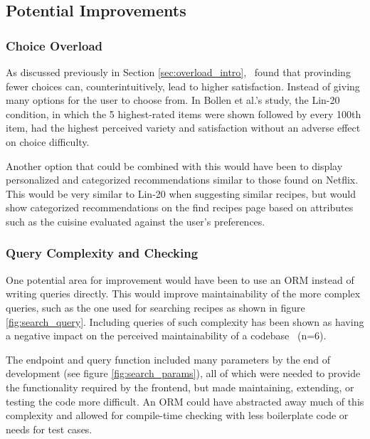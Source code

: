 \subsection{Potential Improvements}

\subsubsection{Choice Overload}\label{sec:choice_overload}
As discussed previously in Section \ref{sec:overload_intro},~\cite{bollen_understanding_2010} found that
provinding fewer choices can, counterintuitively, lead to higher satisfaction. Instead of giving
many options for the user to choose from. In Bollen et al.'s study, the Lin-20 condition, in which
the 5 highest-rated items were shown followed by every 100th item, had the highest perceived variety
and satisfaction without an adverse effect on choice difficulty.

Another option that could be combined with this would have been to display personalized and categorized
recommendations similar to those found on Netflix. This would be very similar to Lin-20 when suggesting
similar recipes, but would show categorized recommendations on the find recipes page based on attributes
such as the cuisine evaluated against the user's preferences.~\cite{gomez-uribe_netflix_2016}

\subsubsection{Query Complexity and Checking}\label{sec:search_complexity}
One potential area for improvement would have been to use an ORM instead of
writing queries directly. This would improve maintainability of the more complex
queries, such as the one used for searching recipes as shown in figure \ref{fig:search_query}.
Including queries of such complexity has been shown as having a negative impact on the perceived
maintainability of a codebase~\cite{yamashita_code_2012} (n=6).

The endpoint and query function included many parameters by the end of development
(see figure \ref{fig:search_params}), all of which were needed to provide the functionality
required by the frontend, but made maintaining, extending, or testing the code more difficult.
An ORM could have abstracted away much of this complexity and allowed for compile-time checking
with less boilerplate code or needs for test cases.
